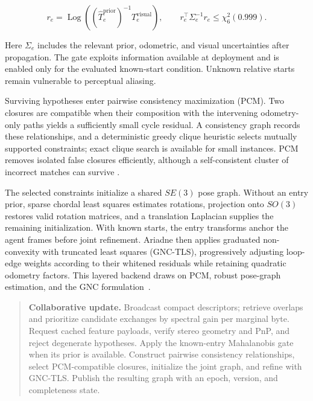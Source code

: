\documentclass[10pt,a4paper]{article}
\begin{document}
\begin{equation}
    r_e =
    \operatorname{Log}\!
    \left(
        (\hat T_e^{\mathrm{prior}})^{-1}
        T_e^{\mathrm{visual}}
    \right),
    \qquad
    r_e^\top\Sigma_e^{-1}r_e
    \leq \chi^2_6(0.999).
    \label{eq:collab-entry-gate}
\end{equation}

Here $\Sigma_e$ includes the relevant prior, odometric, and visual
uncertainties after propagation. The gate exploits information available at
deployment and is enabled only for the evaluated known-start condition.
Unknown relative starts remain vulnerable to perceptual aliasing.

Surviving hypotheses enter pairwise consistency maximization (PCM). Two
closures are compatible when their composition with the intervening
odometry-only paths yields a sufficiently small cycle residual. A consistency
graph records these relationships, and a deterministic greedy clique heuristic
selects mutually supported constraints; exact clique search is available for
small instances. PCM removes isolated false closures efficiently, although a
self-consistent cluster of incorrect matches can survive
\cite{mangelson2018pcm}.

The selected constraints initialize a shared $SE(3)$ pose graph. Without an
entry prior, sparse chordal least squares estimates rotations, projection onto
$SO(3)$ restores valid rotation matrices, and a translation Laplacian supplies
the remaining initialization. With known starts, the entry transforms anchor
the agent frames before joint refinement. Ariadne then applies graduated
non-convexity with truncated least squares (GNC-TLS), progressively adjusting
loop-edge weights according to their whitened residuals while retaining
quadratic odometry factors. This layered backend draws on PCM, robust pose-graph
estimation, and the GNC formulation~\cite{tian2022kimeramulti,yang2020gnc}.

\begin{quote}\small
\textbf{Collaborative update.}
Broadcast compact descriptors; retrieve overlaps and prioritize candidate
exchanges by spectral gain per marginal byte. Request cached feature payloads,
verify stereo geometry and PnP, and reject degenerate hypotheses. Apply the
known-entry Mahalanobis gate when its prior is available. Construct pairwise
consistency relationships, select PCM-compatible closures, initialize the
joint graph, and refine with GNC-TLS. Publish the resulting graph with an
epoch, version, and completeness state.
\end{quote}
\end{document}
